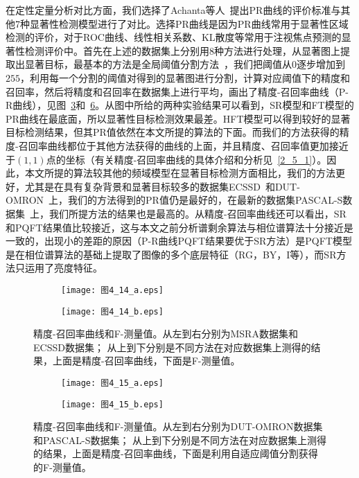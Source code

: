 在定性定量分析对比方面，我们选择了Achanta等人~\cite{AchantaCVPR2009Frequency}提出PR曲线的评价标准与其他7种显著性检测模型进行了对比。选择PR曲线是因为PR曲线常用于显著性区域检测的评价，对于ROC曲线、线性相关系数、KL散度等常用于注视焦点预测的显著性检测评价中。首先在上述的数据集上分别用$8$种方法进行处理，从显著图上提取出显著目标，最基本的方法是全局阈值分割方法~\cite{王岩2012注意}，我们把阈值从$0$逐步增加到$255$，利用每一个分割的阈值对得到的显著图进行分割，计算对应阈值下的精度和召回率，然后将精度和召回率在数据集上进行平均，画出了精度-召回率曲线（P-R曲线），见图~\ref{图4_14}和~\ref{图4_15}。从图中所给的两种实验结果可以看到，SR模型和FT模型的PR曲线在最底面，所以显著性目标检测效果最差。HFT模型可以得到较好的显著目标检测结果，但其PR值依然在本文所提的算法的下面。而我们的方法获得的精度-召回率曲线都位于其他方法获得的曲线的上面，并且精度、召回率值更加接近于$(1,1)$点的坐标（有关精度-召回率曲线的具体介绍和分析见~\ref{2_5_1}）。因此，本文所提的算法较其他的频域模型在显著目标检测方面相比，我们的方法更好，尤其是在具有复杂背景和显著目标较多的数据集ECSSD~\cite{YanQiongCVPR2013Hierarchical}和DUT-OMRON~\cite{YangChuanCVPR2013Manifold}上，我们的方法得到的PR值仍是最好的，在最新的数据集PASCAL-S数据集~\cite{LiYinCVPR2014Secrets}上，我们所提方法的结果也是最高的。从精度-召回率曲线还可以看出，SR和PQFT结果值比较接近，这与本文之前分析谱剩余算法与相位谱算法十分接近是一致的，出现小的差距的原因（P-R曲线PQFT结果要优于SR方法）是PQFT模型是在相位谱算法的基础上提取了图像的多个底层特征（RG，BY，I等），而SR方法只运用了亮度特征。
\begin{figure}[h]
  \centering%
  \begin{subfigure}{5.5cm}
    \texttt{[image: 图4\_14\_a.eps]}
    \caption{}
  \label{图4_14_a}
  \end{subfigure}
  \hspace{4em}%
  \begin{subfigure}{0.45\textwidth}
    \texttt{[image: 图4\_14\_b.eps]}
    \caption{}
  \label{图4_14_b}
  \end{subfigure}
  \caption{精度-召回率曲线和F-测量值。从左到右分别为MSRA数据集和ECSSD数据集； 从上到下分别是不同方法在对应数据集上测得的结果，上面是精度-召回率曲线，下面是F-测量值。}
  \label{图4_14}
\end{figure}
\begin{figure}[h]
  \centering%
  \begin{subfigure}{5.5cm}
    \texttt{[image: 图4\_15\_a.eps]}
    \caption{}
  \label{图4_15_a}
  \end{subfigure}
  \hspace{4em}%
  \begin{subfigure}{0.45\textwidth}
    \texttt{[image: 图4\_15\_b.eps]}
    \caption{}
  \label{图4_15_b}
  \end{subfigure}
  \caption{精度-召回率曲线和F-测量值。从左到右分别为DUT-OMRON数据集和PASCAL-S数据集； 从上到下分别是不同方法在对应数据集上测得的结果，上面是精度-召回率曲线，下面是利用自适应阈值分割获得的F-测量值。}
  \label{图4_15}
\end{figure}

